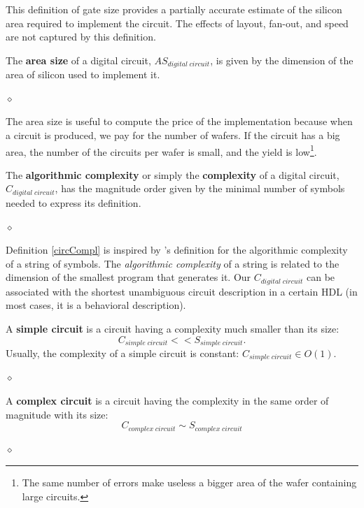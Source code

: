 This definition of gate size provides a partially accurate estimate of
the silicon area required to implement the circuit. The effects of
layout, fan-out, and speed are not captured by this definition.

\begin{definition}
The {\bf area size} of a digital circuit, $AS_{digital \;
circuit}$, is given by the dimension of the area of silicon used
to implement it.

$\diamond$
\end{definition}

The area size is useful to compute the price of the implementation
because when a circuit is produced, we pay for the number of
wafers. If the circuit has a big area, the number of the circuits
per wafer is small, and the yield is low\footnote{The same number
of errors make useless  a bigger area of the wafer containing
large circuits.}.

\begin{definition}\label{circCompl}
The {\bf algorithmic complexity} or simply the {\bf complexity} of a digital circuit, $C_{digital \; circuit}$, has the magnitude
order given by the minimal number of symbols needed to express its
definition.

$\diamond$
\end{definition}

Definition \ref{circCompl} is inspired by \cite{Chaitin77}'s definition for the
algorithmic complexity of a string of symbols. The
{\em algorithmic complexity} of a string is related to the
dimension of the smallest program that generates it.  Our $C_{digital \; circuit}$ can be associated with the shortest unambiguous circuit description
in a certain HDL (in most cases, it is a behavioral description).

\begin{definition}
A {\bf simple circuit} is a circuit having a complexity
much smaller than   its size:
$$C_{simple \; circuit} << S_{simple \; circuit}.$$
Usually, the complexity of a simple circuit is constant:
$C_{simple \; circuit} \in O(1)$.

$\diamond$
\end{definition}

\begin{definition}
A {\bf complex circuit} is a circuit having the complexity  in
the same order of magnitude with its size:
$$C_{complex \; circuit} \sim S_{complex \; circuit}$$

$\diamond$
\end{definition}

